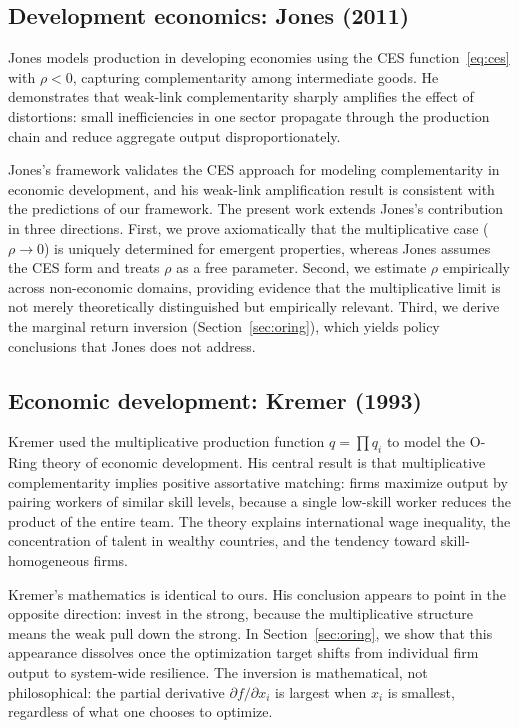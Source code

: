 \documentclass[12pt, a4paper]{article}
\theoremstyle{definition}
\theoremstyle{remark}
\begin{document}
\subsection{Development economics: Jones (2011)}

Jones \cite{jones2011} models production in developing economies using the CES function~\eqref{eq:ces} with $\rho < 0$, capturing complementarity among intermediate goods. He demonstrates that weak-link complementarity sharply amplifies the effect of distortions: small inefficiencies in one sector propagate through the production chain and reduce aggregate output disproportionately.

Jones's framework validates the CES approach for modeling complementarity in economic development, and his weak-link amplification result is consistent with the predictions of our framework. The present work extends Jones's contribution in three directions. First, we prove axiomatically that the multiplicative case ($\rho \to 0$) is uniquely determined for emergent properties, whereas Jones assumes the CES form and treats $\rho$ as a free parameter. Second, we estimate $\rho$ empirically across non-economic domains, providing evidence that the multiplicative limit is not merely theoretically distinguished but empirically relevant. Third, we derive the marginal return inversion (Section~\ref{sec:oring}), which yields policy conclusions that Jones does not address.

\subsection{Economic development: Kremer (1993)}

Kremer \cite{kremer1993} used the multiplicative production function $q = \prod q_i$ to model the O-Ring theory of economic development. His central result is that multiplicative complementarity implies positive assortative matching: firms maximize output by pairing workers of similar skill levels, because a single low-skill worker reduces the product of the entire team. The theory explains international wage inequality, the concentration of talent in wealthy countries, and the tendency toward skill-homogeneous firms.

Kremer's mathematics is identical to ours. His conclusion appears to point in the opposite direction: invest in the strong, because the multiplicative structure means the weak pull down the strong. In Section~\ref{sec:oring}, we show that this appearance dissolves once the optimization target shifts from individual firm output to system-wide resilience. The inversion is mathematical, not philosophical: the partial derivative $\partial f / \partial x_i$ is largest when $x_i$ is smallest, regardless of what one chooses to optimize.
\end{document}
